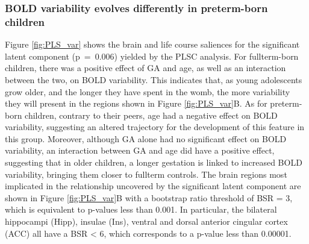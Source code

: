 \subsubsection*{BOLD variability evolves differently in preterm-born children} 
Figure \ref{fig:PLS_var} shows the brain and life course saliences for the significant latent component (p~=~0.006) yielded by the PLSC analysis. For fullterm-born children, there was a positive effect of GA and age, as well as an interaction between the two, on BOLD variability. This indicates that, as young adolescents grow older, and the longer they have spent in the womb, the more variability they will present in the regions shown in Figure \ref{fig:PLS_var}B. As for preterm-born children, contrary to their peers, age had a negative effect on BOLD variability, suggesting an altered trajectory for the development of this feature in this group. Moreover, although GA alone had no significant effect on BOLD variability, an interaction between GA and age did have a positive effect, suggesting that in older children, a longer gestation is linked to increased BOLD variability, bringing them closer to fullterm controls. The brain regions most implicated in the relationship uncovered by the significant latent component are shown in  Figure \ref{fig:PLS_var}B with a bootstrap ratio threshold of BSR = 3, which is equivalent to p-values less than 0.001.  In particular, the bilateral hippocampi (Hipp), insulae (Ins), ventral and dorsal anterior cingular cortex (ACC) all have a BSR < 6, which corresponds to a p-value less than 0.00001.



